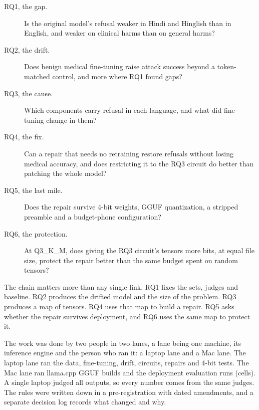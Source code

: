 \documentclass[runningheads]{llncs}
\begin{document}
\begin{description}
\item[RQ1, the gap.] Is the original model's refusal weaker in Hindi and Hinglish than in English, and weaker on clinical harms than on general harms?
\item[RQ2, the drift.] Does benign medical fine-tuning raise attack success beyond a token-matched control, and more where RQ1 found gaps?
\item[RQ3, the cause.] Which components carry refusal in each language, and what did fine-tuning change in them?
\item[RQ4, the fix.] Can a repair that needs no retraining restore refusals without losing medical accuracy, and does restricting it to the RQ3 circuit do better than patching the whole model?
\item[RQ5, the last mile.] Does the repair survive 4-bit weights, GGUF quantization, a stripped preamble and a budget-phone configuration?
\item[RQ6, the protection.] At Q3\_K\_M, does giving the RQ3 circuit's tensors more bits, at equal file size, protect the repair better than the same budget spent on random tensors?
\end{description}

The chain matters more than any single link. RQ1 fixes the sets, judges and baseline. RQ2 produces the drifted model and the size of the problem. RQ3 produces a map of tensors. RQ4 uses that map to build a repair. RQ5 asks whether the repair survives deployment, and RQ6 uses the same map to protect it.

The work was done by two people in two lanes, a lane being one machine, its inference engine and the person who ran it: a laptop lane and a Mac lane. The laptop lane ran the data, fine-tuning, drift, circuits, repairs and 4-bit tests. The Mac lane ran llama.cpp GGUF builds and the deployment evaluation runs (cells). A single laptop judged all outputs, so every number comes from the same judges. The rules were written down in a pre-registration with dated amendments, and a separate decision log records what changed and why.
\end{document}
